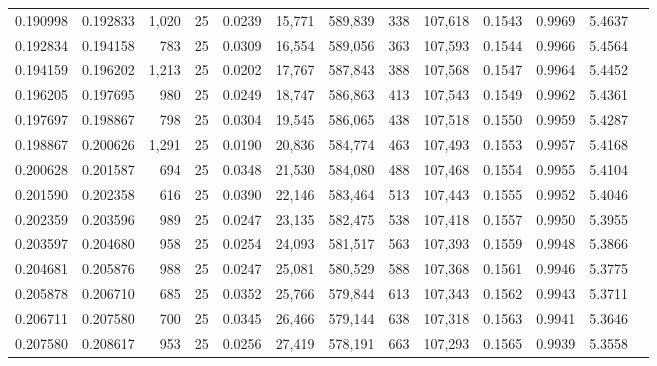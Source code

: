 \begin{tabular}{rrrrrrrrrrrrr}
0.190998 & 0.192833 & 1,020 &  25 &                                     0.0239 &  15,771 & 589,839 &     338 & 107,618 & 0.1543 & 0.9969 & 5.4637 \\
0.192834 & 0.194158 &   783 &  25 &                                     0.0309 &  16,554 & 589,056 &     363 & 107,593 & 0.1544 & 0.9966 & 5.4564 \\
0.194159 & 0.196202 & 1,213 &  25 &                                     0.0202 &  17,767 & 587,843 &     388 & 107,568 & 0.1547 & 0.9964 & 5.4452 \\
0.196205 & 0.197695 &   980 &  25 &                                     0.0249 &  18,747 & 586,863 &     413 & 107,543 & 0.1549 & 0.9962 & 5.4361 \\
0.197697 & 0.198867 &   798 &  25 &                                     0.0304 &  19,545 & 586,065 &     438 & 107,518 & 0.1550 & 0.9959 & 5.4287 \\
0.198867 & 0.200626 & 1,291 &  25 &                                     0.0190 &  20,836 & 584,774 &     463 & 107,493 & 0.1553 & 0.9957 & 5.4168 \\
0.200628 & 0.201587 &   694 &  25 &                                     0.0348 &  21,530 & 584,080 &     488 & 107,468 & 0.1554 & 0.9955 & 5.4104 \\
0.201590 & 0.202358 &   616 &  25 &                                     0.0390 &  22,146 & 583,464 &     513 & 107,443 & 0.1555 & 0.9952 & 5.4046 \\
0.202359 & 0.203596 &   989 &  25 &                                     0.0247 &  23,135 & 582,475 &     538 & 107,418 & 0.1557 & 0.9950 & 5.3955 \\
0.203597 & 0.204680 &   958 &  25 &                                     0.0254 &  24,093 & 581,517 &     563 & 107,393 & 0.1559 & 0.9948 & 5.3866 \\
0.204681 & 0.205876 &   988 &  25 &                                     0.0247 &  25,081 & 580,529 &     588 & 107,368 & 0.1561 & 0.9946 & 5.3775 \\
0.205878 & 0.206710 &   685 &  25 &                                     0.0352 &  25,766 & 579,844 &     613 & 107,343 & 0.1562 & 0.9943 & 5.3711 \\
0.206711 & 0.207580 &   700 &  25 &                                     0.0345 &  26,466 & 579,144 &     638 & 107,318 & 0.1563 & 0.9941 & 5.3646 \\
0.207580 & 0.208617 &   953 &  25 &                                     0.0256 &  27,419 & 578,191 &     663 & 107,293 & 0.1565 & 0.9939 & 5.3558 \\

\end{tabular}
